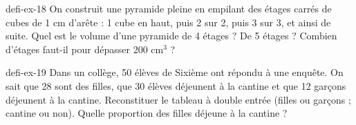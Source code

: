 \begin{blocEdition}{defi-ex-18}
On construit une pyramide pleine en empilant des étages carrés de cubes de 1 cm d’arête : 1 cube en haut, puis 2 sur 2, puis 3 sur 3, et ainsi de suite. Quel est le volume d’une pyramide de 4 étages ? De 5 étages ? Combien d’étages faut-il pour dépasser 200 cm$^3$ ?\label{fig-defi-18}
\par{}\par\par{}\par{}\par{}\par{}\par{}\par{}
\end{blocEdition}
\begin{blocEdition}{defi-ex-19}
Dans un collège, 50 élèves de Sixième ont répondu à une enquête. On sait que 28 sont des filles, que 30 élèves déjeunent à la cantine et que 12 garçons déjeunent à la cantine. Reconstituer le tableau à double entrée (filles ou garçons ; cantine ou non). Quelle proportion des filles déjeune à la cantine ?\par{}\par\par{}\par{}\par{}\par{}\par{}\par{}
\end{blocEdition}
